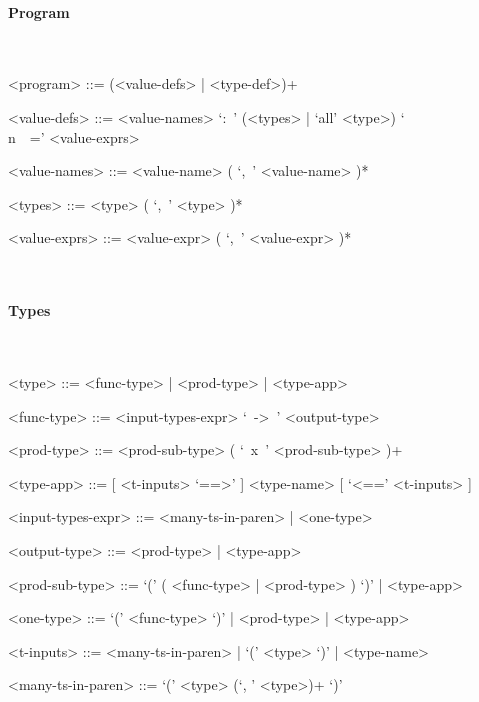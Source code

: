 \documentclass{article}
\begin{document}
\paragraph{Program}
\hspace{1cm}\\
\begin{grammar}

<program> ::= (<value-defs> | <type-def>)+

<value-defs> ::=
<value-names> `:\ ' (<types> | `all' <type>) `\\n\ \ =' <value-exprs>

<value-names> ::= <value-name> ( `,\ ' <value-name> )*  

<types> ::= <type> ( `,\ ' <type> )*  

<value-exprs> ::= <value-expr> ( `,\ ' <value-expr> )*  

\end{grammar}
\hspace{1cm}\\

\paragraph{Types}

\hspace{1cm}\\
\begin{grammar}

<type> ::= <func-type> | <prod-type> | <type-app>

<func-type> ::= <input-types-expr> `\ ->\ ' <output-type>

<prod-type> ::= <prod-sub-type> ( `\ x\ ' <prod-sub-type> )+

<type-app> ::= [ <t-inputs> `==>' ] <type-name> [ `<==' <t-inputs> ]
 
<input-types-expr> ::= <many-ts-in-paren> | <one-type>

<output-type> ::= <prod-type> | <type-app>

<prod-sub-type> ::= `(' ( <func-type> | <prod-type> ) `)' | <type-app>

<one-type> ::= `(' <func-type> `)' | <prod-type> | <type-app>

<t-inputs> ::= <many-ts-in-paren> | `(' <type> `)' | <type-name>

<many-ts-in-paren> ::=  `(' <type> (`, ' <type>)+ `)'

\end{grammar}


\hspace{1cm}\\
\end{document}
